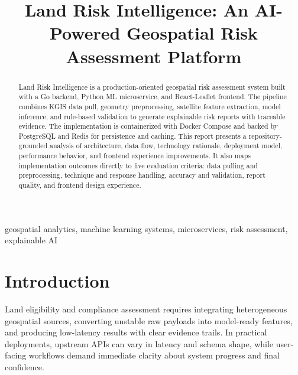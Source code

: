 \documentclass[conference]{IEEEtran}
\begin{document}
\title{Land Risk Intelligence: An AI-Powered Geospatial Risk Assessment Platform}

\author{   \and {}  \and {}  \and {}  }

\maketitle

\begin{abstract}
Land Risk Intelligence is a production-oriented geospatial risk assessment system built with a Go backend, Python ML microservice, and React-Leaflet frontend. The pipeline combines KGIS data pull, geometry preprocessing, satellite feature extraction, model inference, and rule-based validation to generate explainable risk reports with traceable evidence. The implementation is containerized with Docker Compose and backed by PostgreSQL and Redis for persistence and caching. This report presents a repository-grounded analysis of architecture, data flow, technology rationale, deployment model, performance behavior, and frontend experience improvements. It also maps implementation outcomes directly to five evaluation criteria: data pulling and preprocessing, technique and response handling, accuracy and validation, report quality, and frontend design experience.
\end{abstract}

\begin{IEEEkeywords}
geospatial analytics, machine learning systems, microservices, risk assessment, explainable AI
\end{IEEEkeywords}

\section{Introduction}
Land eligibility and compliance assessment requires integrating heterogeneous geospatial sources, converting unstable raw payloads into model-ready features, and producing low-latency results with clear evidence trails. In practical deployments, upstream APIs can vary in latency and schema shape, while user-facing workflows demand immediate clarity about system progress and final confidence.
\end{document}
